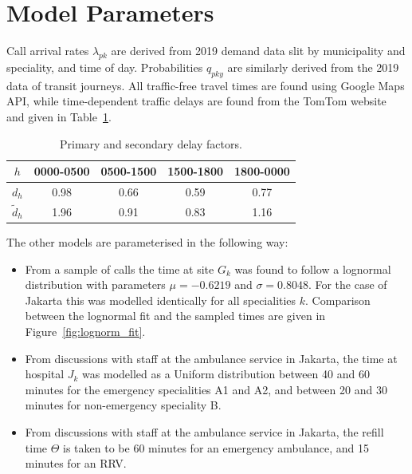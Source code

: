 \documentclass[preprint,12pt]{elsarticle}
\begin{document}
\section{Model Parameters}\label{apx:parameters}
Call arrival rates $\lambda_{pk}$ are derived from 2019 demand data slit by
municipality and speciality, and time of day. Probabilities $q_{pky}$ are
similarly derived from the 2019 data of transit journeys. All traffic-free
travel times are found using Google Maps API, while time-dependent traffic
delays are found from the TomTom website and given in
Table~\ref{tbl:delay_factors}.

\begin{table}
\begin{center}
\begin{tabular}{ccccc}
\toprule
$h$ & 0000-0500 & 0500-1500 & 1500-1800 & 1800-0000 \\
\midrule
$d_h$ & 0.98 & 0.66 & 0.59 & 0.77 \\
$\tilde{d}_h$ & 1.96 & 0.91 & 0.83 & 1.16 \\
\bottomrule
\end{tabular}
\end{center}
\caption{Primary and secondary delay factors.}
\label{tbl:delay_factors}
\end{table}

The other models are parameterised in the following way:
\begin{itemize}
  \item From a sample of calls the time at site $G_k$ was found to follow a
        lognormal distribution with parameters $\mu=-0.6219$ and $\sigma=0.8048$.
        For the case of Jakarta this was modelled identically for all
        specialities $k$. Comparison between the lognormal fit and the sampled
        times are given in Figure~\ref{fig:lognorm_fit}.
  \item From discussions with staff at the ambulance service in Jakarta, the
        time at hospital $J_k$ was modelled as a Uniform distribution between
        40 and 60 minutes for the emergency specialities A1 and A2, and
        between 20 and 30 minutes for non-emergency speciality B.
  \item From discussions with staff at the ambulance service in Jakarta, the
        refill time $\Theta$ is taken to be 60 minutes for an emergency
        ambulance, and 15 minutes for an RRV.
\end{itemize}
\end{document}
